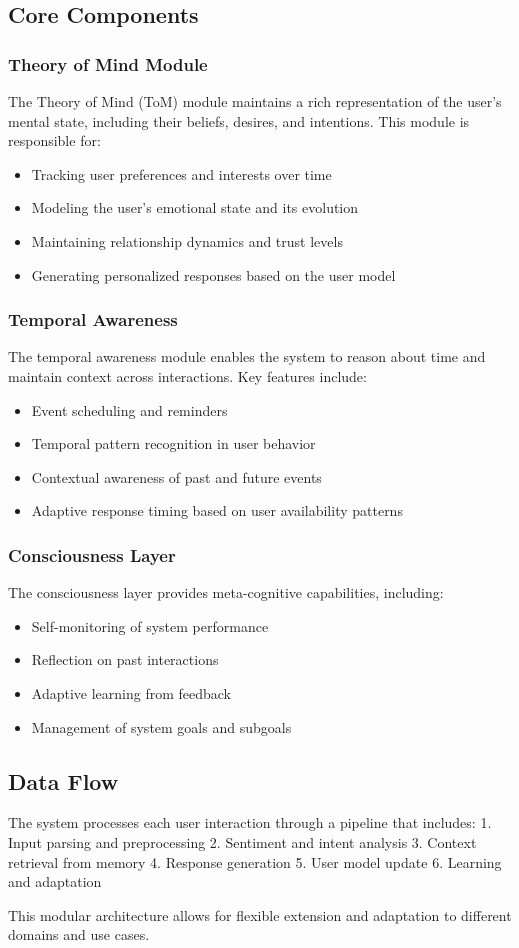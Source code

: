 \subsection{Core Components}

\subsubsection{Theory of Mind Module}
The Theory of Mind (ToM) module maintains a rich representation of the user's mental state, including their beliefs, desires, and intentions. This module is responsible for:
\begin{itemize}
    \item Tracking user preferences and interests over time
    \item Modeling the user's emotional state and its evolution
    \item Maintaining relationship dynamics and trust levels
    \item Generating personalized responses based on the user model
\end{itemize}

\subsubsection{Temporal Awareness}
The temporal awareness module enables the system to reason about time and maintain context across interactions. Key features include:
\begin{itemize}
    \item Event scheduling and reminders
    \item Temporal pattern recognition in user behavior
    \item Contextual awareness of past and future events
    \item Adaptive response timing based on user availability patterns
\end{itemize}

\subsubsection{Consciousness Layer}
The consciousness layer provides meta-cognitive capabilities, including:
\begin{itemize}
    \item Self-monitoring of system performance
    \item Reflection on past interactions
    \item Adaptive learning from feedback
    \item Management of system goals and subgoals
\end{itemize}

\subsection{Data Flow}
The system processes each user interaction through a pipeline that includes:
1. Input parsing and preprocessing
2. Sentiment and intent analysis
3. Context retrieval from memory
4. Response generation
5. User model update
6. Learning and adaptation

This modular architecture allows for flexible extension and adaptation to different domains and use cases.
